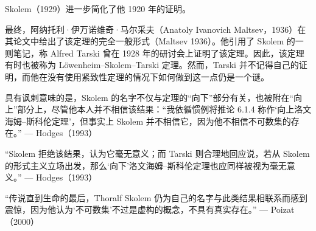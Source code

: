 Skolem（1929）进一步简化了他 1920 年的证明。  

最终，阿纳托利·伊万诺维奇·马尔采夫（Anatoly Ivanovich Maltsev，1936）在其论文中给出了该定理的完全一般形式（Maltsev 1936）。他引用了 Skolem 的一则笔记，称 Alfred Tarski 曾在 1928 年的研讨会上证明了该定理。因此，该定理有时也被称为 Löwenheim–Skolem–Tarski 定理。然而，Tarski 并不记得自己的证明，而他在没有使用紧致性定理的情况下如何做到这一点仍是一个谜。

具有讽刺意味的是，Skolem 的名字不仅与定理的“向下”部分有关，也被附在“向上”部分上，尽管他本人并不相信该结果：“我依循惯例将推论 6.1.4 称作‘向上洛文海姆–斯科伦定理’，但事实上 Skolem 并不相信它，因为他不相信不可数集的存在。” — Hodges（1993）

“Skolem 拒绝该结果，认为它毫无意义；而 Tarski 则合理地回应说，若从 Skolem 的形式主义立场出发，那么‘向下’洛文海姆–斯科伦定理也应同样被视为毫无意义。” — Hodges（1993）

“传说直到生命的最后，Thoralf Skolem 仍为自己的名字与此类结果相联系而感到震惊，因为他认为‘不可数集’不过是虚构的概念，不具有真实存在。” — Poizat（2000）

